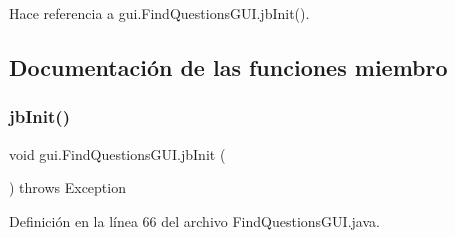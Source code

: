 Hace referencia a gui.\+Find\+Questions\+G\+U\+I.\+jb\+Init().



\subsection{Documentación de las funciones miembro}
\mbox{\label{classgui_1_1FindQuestionsGUI_aad17c86d2c85160c905e9daec2406c2f}} 
\subsubsection{\texorpdfstring{jbInit()}{jbInit()}}
{\footnotesize\ttfamily void gui.\+Find\+Questions\+G\+U\+I.\+jb\+Init (\begin{DoxyParamCaption}{ }\end{DoxyParamCaption}) throws Exception\hspace{0.3cm}{\ttfamily [private]}}



Definición en la línea 66 del archivo Find\+Questions\+G\+U\+I.\+java.


